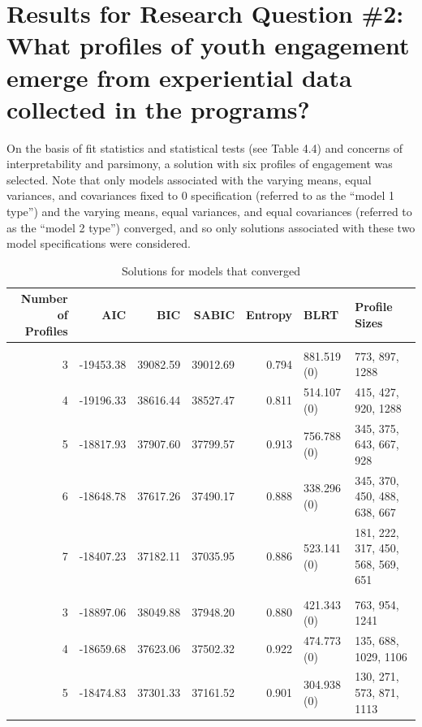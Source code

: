 \documentclass[]{msu-thesis}
\theoremstyle{definition}
\theoremstyle{definition}
\theoremstyle{definition}
\theoremstyle{remark}
\begin{document}
\section{Results for Research Question \#2: What profiles of youth
engagement emerge from experiential data collected in the
programs?}\label{results-for-research-question-2-what-profiles-of-youth-engagement-emerge-from-experiential-data-collected-in-the-programs}

On the basis of fit statistics and statistical tests (see Table 4.4) and
concerns of interpretability and parsimony, a solution with six profiles
of engagement was selected. Note that only models associated with the
varying means, equal variances, and covariances fixed to 0 specification
(referred to as the ``model 1 type'') and the varying means, equal
variances, and equal covariances (referred to as the ``model 2 type'')
converged, and so only solutions associated with these two model
specifications were considered.

\begin{landscape}\begin{table}

\caption{\label{tab:unnamed-chunk-10}Solutions for models that converged}
\centering
\begin{tabular}[t]{rrrrrll}
\toprule
Number of Profiles & AIC & BIC & SABIC & Entropy & BLRT & Profile Sizes\\
\midrule
\addlinespace[0.3em]
\multicolumn{7}{l}{\textbf{Model 1}}\\
\hspace{1em}3 & -19453.38 & 39082.59 & 39012.69 & 0.794 & 881.519 (0) & 773, 897, 1288\\
\hspace{1em}4 & -19196.33 & 38616.44 & 38527.47 & 0.811 & 514.107 (0) & 415, 427, 920, 1288\\
\hspace{1em}5 & -18817.93 & 37907.60 & 37799.57 & 0.913 & 756.788 (0) & 345, 375, 643, 667, 928\\
\hspace{1em}6 & -18648.78 & 37617.26 & 37490.17 & 0.888 & 338.296 (0) & 345, 370, 450, 488, 638, 667\\
\hspace{1em}7 & -18407.23 & 37182.11 & 37035.95 & 0.886 & 523.141 (0) & 181, 222, 317, 450, 568, 569, 651\\
\addlinespace[0.3em]
\multicolumn{7}{l}{\textbf{Model 2}}\\
\hspace{1em}3 & -18897.06 & 38049.88 & 37948.20 & 0.880 & 421.343 (0) & 763, 954, 1241\\
\hspace{1em}4 & -18659.68 & 37623.06 & 37502.32 & 0.922 & 474.773 (0) & 135, 688, 1029, 1106\\
\hspace{1em}5 & -18474.83 & 37301.33 & 37161.52 & 0.901 & 304.938 (0) & 130, 271, 573, 871, 1113\\
\bottomrule
\end{tabular}
\end{table}
\end{landscape}
\end{document}
